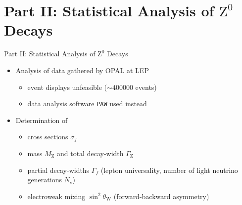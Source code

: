 \documentclass[11pt,xcolor=dvipsnames,professionalfonts]{beamer}
\begin{document}
\section{Part II: Statistical Analysis of $\mathrm{Z}^0$ Decays}
\begin{frame}{Part II: Statistical Analysis of $\mathrm{Z}^0$ Decays}
	\begin{itemize}
		\setlength\itemsep{2.em}
		\item Analysis of data gathered by OPAL at LEP
		\begin{itemize}
			\setlength\itemsep{0.5em}
			\item event displays unfeasible ($\sim \num{400000}$ events)
			\item data analysis software \texttt{PAW} used instead
		\end{itemize}
		
		\item Determination of
		\begin{itemize}
			\setlength\itemsep{0.5em}
			\item cross sections $\sigma_f$
			
			\item mass $M_\mathrm{Z}$ and total decay-width $\Gamma_\mathrm{Z}$
			
			\item partial decay-widths $\Gamma_f$ (lepton universality, number of light neutrino generations $N_\nu$)
			
			\item electroweak mixing $\sin^2\theta_\mathrm{W}$ (forward-backward asymmetry)
		\end{itemize}
	\end{itemize}
\end{frame}
\end{document}
